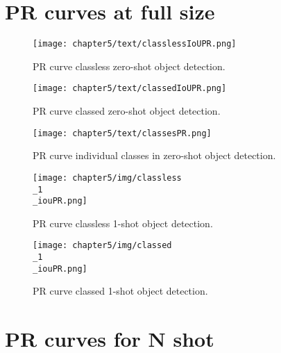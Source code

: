 \chapter{PR curves at full size} \label{app:pr_curves_full_size}


\begin{figure}[H]
    \texttt{[image: chapter5/text/classlessIoUPR.png]}
    \caption{PR curve classless zero-shot object detection.}
    \label{fig:zero_shot_classless_appendix}
\end{figure}

\begin{figure}[H]
    \texttt{[image: chapter5/text/classedIoUPR.png]}
    \caption{PR curve classed zero-shot object detection.}
    \label{fig:zero_shot_classed_appendix}
\end{figure}

\begin{figure}[H]
    \texttt{[image: chapter5/text/classesPR.png]}
    \caption{PR curve individual classes in zero-shot object detection.}
    \label{fig:zero_shot_classed_classes_PR_appendix}
\end{figure}

\begin{figure}[H]
    \texttt{[image: chapter5/img/classless\\\_1\\\_iouPR.png]}
    \caption{PR curve classless 1-shot object detection.}
    \label{fig:1_shot_appendix}
\end{figure}

\begin{figure}[H]
    \texttt{[image: chapter5/img/classed\\\_1\\\_iouPR.png]}
    \caption{PR curve classed 1-shot object detection.}
    \label{fig:2_shot_appendix}
\end{figure}




\chapter{PR curves for N shot} \label{app:pr_curves_n_shot}


